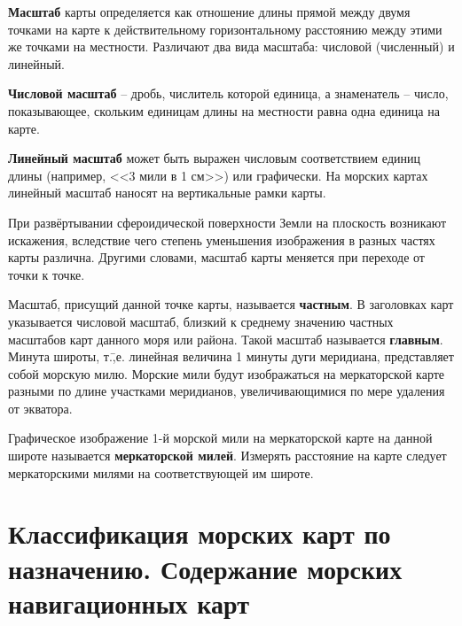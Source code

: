 \textbf{Масштаб} карты определяется как отношение
длины прямой между двумя точками на карте к действительному
горизонтальному расстоянию между этими же точками на
местности. Различают два вида масштаба: числовой (численный) и
линейный.
 
\textbf{Числовой масштаб} \--- дробь,
числитель которой единица, а знаменатель \--- число, показывающее,
скольким единицам длины на местности равна одна единица на карте.

\textbf{Линейный масштаб} может быть
выражен числовым соответствием единиц длины (например, <<3 мили в 1
см>>) или графически. На морских картах линейный масштаб наносят на
вертикальные рамки карты.

При развёртывании сфероидической поверхности Земли на плоскость
возникают искажения, вследствие чего степень уменьшения изображения в
разных частях карты различна. Другими словами, масштаб карты меняется
при переходе от точки к точке.

Масштаб, присущий данной точке карты, называется \textbf{частным}. В
заголовках карт указывается числовой масштаб, близкий к среднему
значению частных масштабов карт данного моря или района. Такой масштаб
называется \textbf{главным}. Минута широты, т.\=,е. линейная величина
1 минуты дуги меридиана, представляет собой морскую милю. Морские мили
будут изображаться на меркаторской карте разными по длине участками
меридианов, увеличивающимися по мере удаления от экватора.

Графическое изображение 1-й морской мили на меркаторской карте на
данной широте называется \textbf{меркаторской
  милей}. Измерять расстояние на карте
следует меркаторскими милями на соответствующей им широте.

\section{Классификация морских карт по назначению. Содержание морских навигационных карт}

